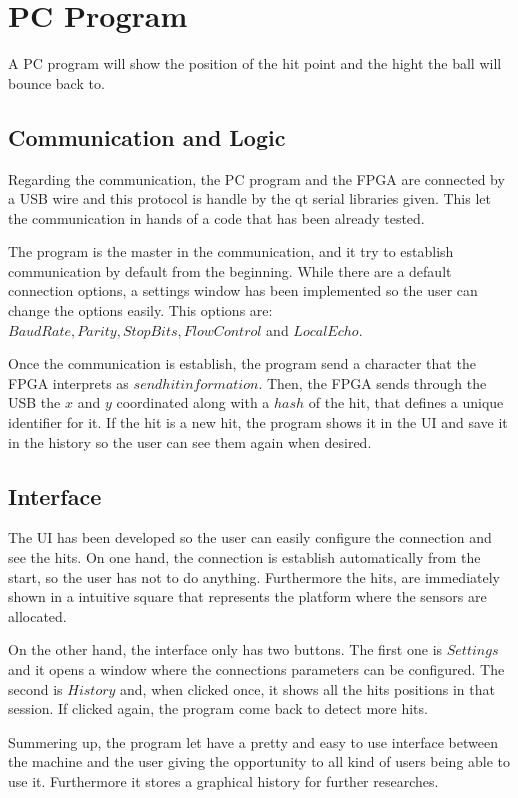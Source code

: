 \chapter{PC Program}
\label{chap:pc_program}
	A PC program will show the position of the hit point and the hight the ball will bounce back to.

	\section{Communication and Logic}
	\label{sec:pc_program_com}
		Regarding the communication, the PC program and the FPGA are connected by a USB wire and this protocol is handle by the qt serial libraries given. 
		This let the communication in hands of a code that has been already tested.

		The program is the master in the communication, and it try to establish communication by default from the beginning. 
		While there are a default connection options, a settings window has been implemented so the user can change the options easily. 
		This options are: $Baud Rate, Parity, Stop Bits, Flow Control$ and $Local Echo$.

		Once the communication is establish, the program send a character that the FPGA interprets as $send hit information$. 
		Then, the FPGA sends through the USB the $x$ and $y$ coordinated along with a $hash$ of the hit, that defines a unique identifier for it. 
		If the hit is a new hit, the program shows it in the UI and save it in the history so the user can see them again when desired.

	\section{Interface}
	\label{sec:pc_program_interface}
		The UI has been developed so the user can easily configure the connection and see the hits. 
		On one hand, the connection is establish automatically from the start, so the user has not to do anything. Furthermore the hits, are immediately shown in a intuitive square that represents the platform where the sensors are allocated.

		On the other hand, the interface only has two buttons. The first one is $Settings$ and it opens a window where the connections parameters can be configured. The second is $History$ and, when clicked once, it shows all the hits positions in that session. If clicked again, the program come back to detect more hits.

		Summering up, the program let have a pretty and easy to use interface between the machine and the user giving the opportunity to all kind of users being able to use it. Furthermore it stores a graphical history for further researches.


